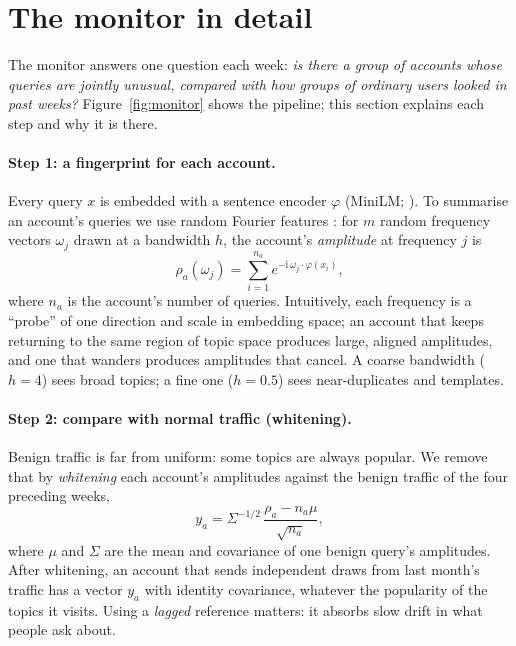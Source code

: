 \section{The monitor in detail}
\label{sec:monitor-full}

The monitor answers one question each week: \emph{is there a group of accounts whose queries are jointly unusual, compared with how groups of ordinary users looked in past weeks?} Figure~\ref{fig:monitor} shows the pipeline; this section explains each step and why it is there.



\paragraph{Step 1: a fingerprint for each account.} Every query $x$ is embedded with a sentence encoder $\varphi$ (MiniLM; \citealp{wang2020minilm,reimers2019sbert}). To summarise an account's queries we use random Fourier features \citep{rahimi2007random}: for $m$ random frequency vectors $\omega_j$ drawn at a bandwidth $h$, the account's \emph{amplitude} at frequency $j$ is
\begin{equation}
\rho_a(\omega_j)=\sum_{i=1}^{n_a} e^{-\mathrm{i}\,\omega_j\cdot\varphi(x_i)},
\end{equation}
where $n_a$ is the account's number of queries. Intuitively, each frequency is a ``probe'' of one direction and scale in embedding space; an account that keeps returning to the same region of topic space produces large, aligned amplitudes, and one that wanders produces amplitudes that cancel. A coarse bandwidth ($h=4$) sees broad topics; a fine one ($h=0.5$) sees near-duplicates and templates.

\paragraph{Step 2: compare with normal traffic (whitening).} Benign traffic is far from uniform: some topics are always popular. We remove that by \emph{whitening} each account's amplitudes against the benign traffic of the four preceding weeks,
\begin{equation}
y_a=\Sigma^{-1/2}\,\frac{\rho_a-n_a\mu}{\sqrt{n_a}},
\end{equation}
where $\mu$ and $\Sigma$ are the mean and covariance of one benign query's amplitudes. After whitening, an account that sends independent draws from last month's traffic has a vector $y_a$ with identity covariance, whatever the popularity of the topics it visits. Using a \emph{lagged} reference matters: it absorbs slow drift in what people ask about.

